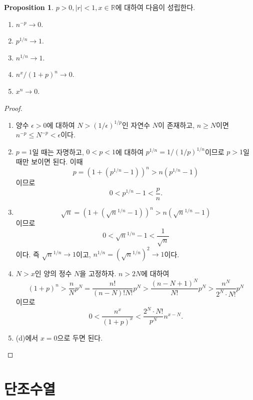 \documentclass[11pt]{book}
\numberwithin{equation}{chapter}
\def\RR{\mathbb{R}}
\def\eps{\epsilon}
\newcommand{\abs}[1]{\left\vert#1\right\vert}
\theoremstyle{definition}
\newtheorem{prop}[thm]{Proposition}
\begin{document}
    \begin{prop}
        \(p > 0, \abs{r} < 1, x \in \RR\)에 대하여 다음이 성립한다.
        \begin{enumerate} [label=(\alph*), leftmargin=2\parindent]
            \item \(n^{-p} \to 0\).
            \item \(p^{1/n} \to 1\).
            \item \(n^{1/n} \to 1\).
            \item \(n^x / (1 + p)^n \to 0\).
            \item \(x^n \to 0\).
        \end{enumerate}
    \end{prop}
    \begin{proof}
        \quad

        \begin{enumerate} [label=(\alph*), leftmargin=2\parindent]
            \item 양수 \(\eps > 0\)에 대하여 \(N > (1/\eps)^{1/p}\)인 자연수 \(N\)이 존재하고, \(n \ge N\)이면 \(n^{-p} \le N^{-p} < \eps\)이다.
            \item \(p = 1\)일 때는 자명하고, \(0 < p < 1\)에 대하여 \(p^{1/n} = 1/(1/p)^{1/n}\)이므로 \(p > 1\)일 때만 보이면 된다. 이때
            \[
            p = (1 + (p^{1/n} - 1))^n > n(p^{1/n} - 1)
            \]
            이므로
            \[
            0 < p^{1/n} - 1 < \frac{p}{n}.
            \]
            \item
            \[
            \sqrt{n} = (1 + (\sqrt{n}^{1/n} - 1))^n > n(\sqrt{n}^{1/n} - 1)    
            \]
            이므로
            \[
            0 < \sqrt{n}^{1/n} - 1 < \frac{1}{\sqrt{n}}
            \]
            이다. 즉 \(\sqrt{n}^{1/n} \to 1\)이고, \(n^{1/n} = (\sqrt{n}^{1/n})^2 \to 1\)이다.
            \item
            \(N > x\)인 양의 정수 \(N\)을 고정하자. \(n > 2N\)에 대하여
            \[
            (1 + p)^n > \frac{n}{N} p^N = \frac{n!}{(n-N)! N!} p^N > \frac{(n-N+1)^N}{N!} p^N > \frac{n^N}{2^N \cdot N!} p^N
            \]
            이므로
            \[
            0 < \frac{n^x}{(1+p)^x} < \frac{2^N \cdot N!}{p^N} n^{x - N}.
            \]
            \item (d)에서 \(x = 0\)으로 두면 된다.
        \end{enumerate}
    \end{proof}

\section{단조수열}
\end{document}
